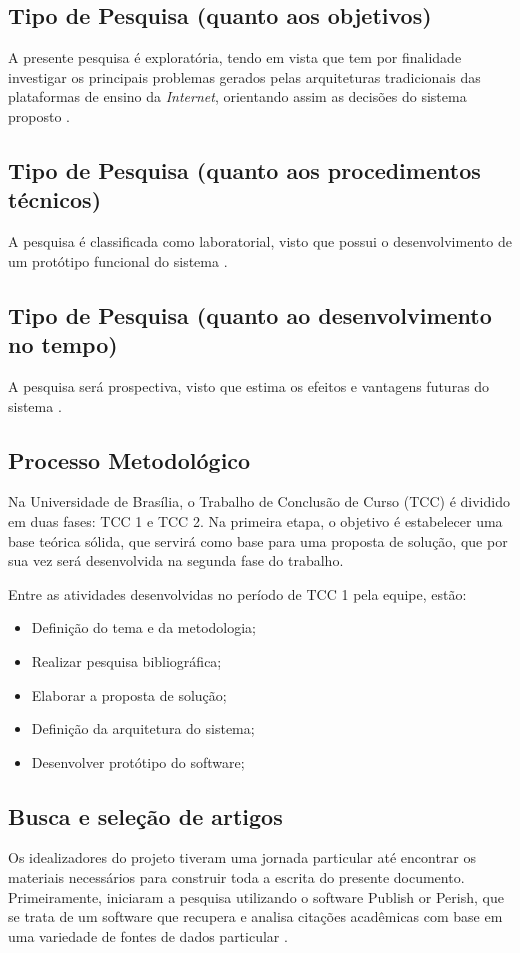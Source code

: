 \subsection{Tipo de Pesquisa (quanto aos objetivos)}
A presente pesquisa é exploratória, tendo em vista que tem por finalidade investigar os principais problemas gerados pelas arquiteturas tradicionais das plataformas de ensino da \textit{Internet}, orientando assim as decisões do sistema proposto \cite{fontelles2009}.

\subsection{Tipo de Pesquisa (quanto aos procedimentos técnicos)}
A pesquisa é classificada como laboratorial, visto que possui o desenvolvimento de um protótipo funcional do sistema \cite{fontelles2009}.

\subsection{Tipo de Pesquisa (quanto ao desenvolvimento no tempo)}
A pesquisa será prospectiva, visto que estima os efeitos e vantagens futuras do sistema \cite{fontelles2009}.

\subsection{Processo Metodológico}
Na Universidade de Brasília, o Trabalho de Conclusão de Curso (TCC) é dividido em duas fases: TCC 1 e TCC 2. Na primeira etapa, o objetivo é estabelecer uma base teórica sólida, que servirá como base para uma proposta de solução, que por sua vez será desenvolvida na segunda fase do trabalho.

Entre as atividades desenvolvidas no período de TCC 1 pela equipe, estão:
\begin{itemize}
    \item Definição do tema e da metodologia;
    \item Realizar pesquisa bibliográfica;
    \item Elaborar a proposta de solução;
    \item Definição da arquitetura do sistema;
    \item Desenvolver protótipo do software;
\end{itemize}

\subsection{Busca e seleção de artigos}
Os idealizadores do projeto tiveram uma jornada particular até encontrar os materiais necessários para construir toda a escrita do presente documento. Primeiramente, iniciaram a pesquisa utilizando o software Publish or Perish, que se trata de um software que recupera e analisa citações acadêmicas com base em uma variedade de fontes de dados particular \cite{harzing2025publish}.

